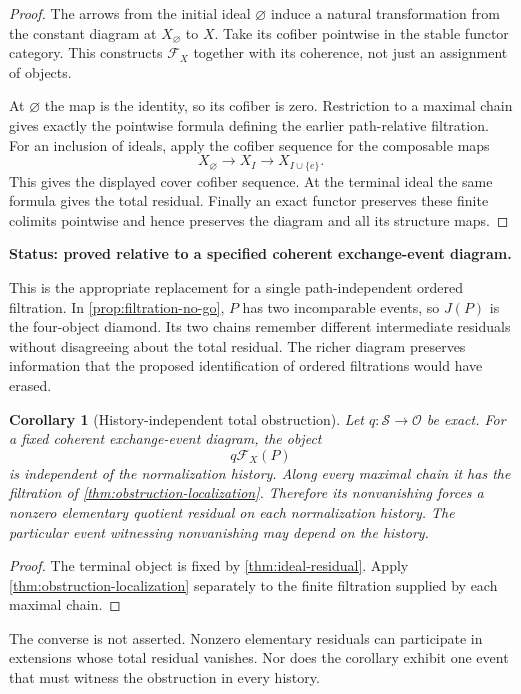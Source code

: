 \documentclass[11pt]{article}
\newtheorem{corollary}[theorem]{Corollary}
\theoremstyle{definition}
\theoremstyle{remark}
\newcommand{\status}[1]{\textbf{Status: #1.}}
\begin{document}
\begin{proof}
The arrows from the initial ideal $\varnothing$ induce a natural transformation from the constant diagram at $X_{\varnothing}$ to $X$. Take its cofiber pointwise in the stable functor category. This constructs $\mathcal F_X$ together with its coherence, not just an assignment of objects.

At $\varnothing$ the map is the identity, so its cofiber is zero. Restriction to a maximal chain gives exactly the pointwise formula defining the earlier path-relative filtration. For an inclusion of ideals, apply the cofiber sequence for the composable maps
\[
X_{\varnothing}\longrightarrow X_I\longrightarrow X_{I\cup\{e\}}.
\]
This gives the displayed cover cofiber sequence. At the terminal ideal the same formula gives the total residual. Finally an exact functor preserves these finite colimits pointwise and hence preserves the diagram and all its structure maps.
\end{proof}

\status{proved relative to a specified coherent exchange-event diagram}

This is the appropriate replacement for a single path-independent ordered filtration. In \cref{prop:filtration-no-go}, $P$ has two incomparable events, so $J(P)$ is the four-object diamond. Its two chains remember different intermediate residuals without disagreeing about the total residual. The richer diagram preserves information that the proposed identification of ordered filtrations would have erased.

\begin{corollary}[History-independent total obstruction]\label{cor:history-obstruction}
Let $q:\mathcal S\to\mathcal O$ be exact. For a fixed coherent exchange-event diagram, the object
\[
q\mathcal F_X(P)
\]
is independent of the normalization history. Along every maximal chain it has the filtration of \cref{thm:obstruction-localization}. Therefore its nonvanishing forces a nonzero elementary quotient residual on \emph{each} normalization history. The particular event witnessing nonvanishing may depend on the history.
\end{corollary}

\begin{proof}
The terminal object is fixed by \cref{thm:ideal-residual}. Apply \cref{thm:obstruction-localization} separately to the finite filtration supplied by each maximal chain.
\end{proof}

The converse is not asserted. Nonzero elementary residuals can participate in extensions whose total residual vanishes. Nor does the corollary exhibit one event that must witness the obstruction in every history.
\end{document}
